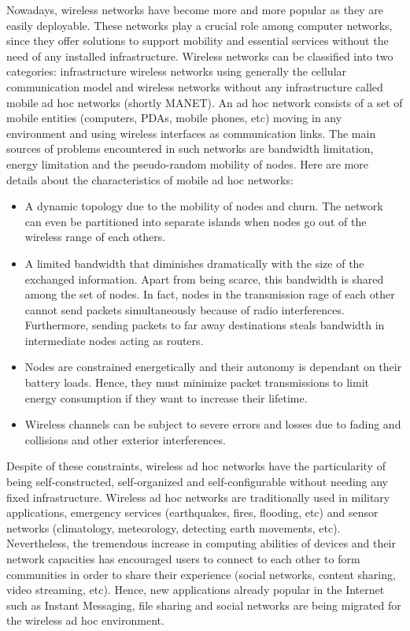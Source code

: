 Nowadays, wireless networks have become more and more popular as they are easily deployable. These networks play a crucial role among computer networks, since they offer solutions to support mobility and essential services without the need of any installed infrastructure. Wireless networks can be classified into two categories: infrastructure wireless networks using generally the cellular communication model and wireless networks without any infrastructure called mobile ad hoc networks (shortly MANET). An ad hoc network consists of a set of mobile entities (computers, PDAs, mobile phones, etc) moving in any environment and using wireless interfaces as communication links. The main sources of problems encountered in such networks are bandwidth limitation, energy limitation and the pseudo-random mobility of nodes. Here are more details about the characteristics of mobile ad hoc networks:
\begin{itemize}
\item{A dynamic topology due to the mobility of nodes and churn. The network can even be partitioned into separate islands when nodes go out of the wireless range of each others.}
\item{A limited bandwidth that diminishes dramatically with the size of the exchanged information. Apart from being scarce, this bandwidth is shared among the set of nodes. In fact, nodes in the transmission rage of each other cannot send packets simultaneously because of radio interferences.  Furthermore, sending packets to far away destinations steals bandwidth in intermediate nodes acting as routers.} 
\item{Nodes are constrained energetically and their autonomy is dependant on their battery loads. Hence, they must minimize packet transmissions to limit energy consumption if they want to increase their lifetime.}
\item{Wireless channels can be subject to severe errors and losses due to fading and collisions and other exterior interferences.}
\end{itemize}

Despite of these constraints, wireless ad hoc networks have the particularity of being self-constructed, self-organized and self-configurable without needing any fixed infrastructure. Wireless ad hoc networks are traditionally used in military applications, emergency services (earthquakes, fires, flooding, etc) and sensor networks (climatology, meteorology, detecting earth movements, etc). Nevertheless, the tremendous increase in computing abilities of devices and their network capacities has encouraged users to connect to each other to form communities in order to share their experience (social networks, content sharing, video streaming, etc). Hence, new applications already popular in the Internet such as Instant Messaging, file sharing and social networks are being migrated for the wireless ad hoc environment.

